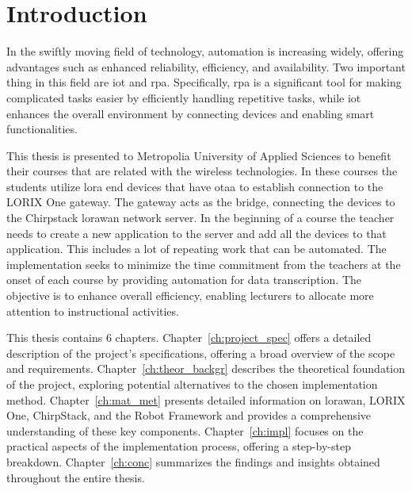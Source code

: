 
\chapter{Introduction}

In the swiftly moving field of technology, automation is increasing widely, offering advantages such as enhanced reliability, efficiency, and availability.
Two important thing in this field are  \gls{iot} and \gls{rpa}. Specifically, \gls{rpa} is a significant tool for making complicated tasks easier by efficiently handling repetitive tasks, while \gls{iot} enhances the overall environment by connecting devices and enabling smart functionalities. 

This thesis is presented to Metropolia University of Applied Sciences to benefit their courses that are related with the wireless technologies. In these courses the students utilize \gls{lora} end devices that have \gls{otaa} to establish connection to the LORIX One gateway. The gateway acts as the bridge, connecting the devices to the Chirpstack \gls{lorawan} network server. In the beginning of a course the teacher needs to create a new application to the server and add all the devices to that application. This includes a lot of repeating work that can be automated. The implementation seeks to minimize the time commitment from the teachers at the onset of each course by providing automation for data transcription. The objective is to enhance overall efficiency, enabling lecturers to allocate more attention to instructional activities.

This thesis contains 6 chapters. Chapter~\ref{ch:project_spec} offers a detailed description of the project's specifications, offering a broad overview of the scope and requirements. Chapter~\ref{ch:theor_backgr} describes the theoretical foundation of the project, exploring potential alternatives to the chosen implementation method. Chapter~\ref{ch:mat_met} presents detailed information on \gls{lorawan}, LORIX One, ChirpStack, and the Robot Framework and provides a comprehensive understanding of these key components.
Chapter~\ref{ch:impl} focuses on the practical aspects of the implementation process, offering a step-by-step breakdown.
Chapter~\ref{ch:conc} summarizes the findings and insights obtained throughout the entire thesis.


\clearpage %
